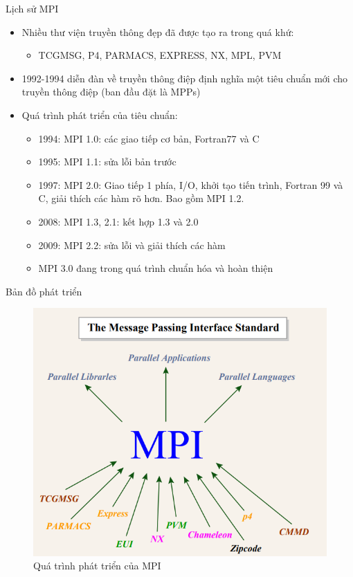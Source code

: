 \documentclass[10pt]{beamer}
\theoremstyle{remark}
\numberwithin{algocf}{section}
\numberwithin{equation}{section}
\numberwithin{dl}{section}
\numberwithin{figure}{section}
\begin{document}
\begin{frame}{Lịch sử MPI}
    \begin{itemize}
        \item Nhiều thư viện truyền thông đẹp đã được tạo ra trong quá khứ:
        \begin{itemize}
            \item TCGMSG, P4, PARMACS, EXPRESS, NX, MPL, PVM
        \end{itemize}
        \item 1992-1994 diễn đàn về truyền thông điệp định nghĩa một tiêu chuẩn mới cho truyền thông điệp (ban đầu đặt là MPPs)
        \item Quá trình phát triển của tiêu chuẩn:
        \begin{itemize}
            \item 1994: MPI 1.0: các giao tiếp cơ bản, Fortran77 và C
            \item 1995: MPI 1.1: sửa lỗi bản trước
            \item 1997: MPI 2.0: Giao tiếp 1 phía, I/O, khởi tạo tiến trình, Fortran 99 và C, giải thích các hàm rõ hơn. Bao gồm MPI 1.2.
            \item 2008: MPI 1.3, 2.1: kết hợp 1.3 và 2.0
            \item 2009: MPI 2.2: sửa lỗi và giải thích các hàm
            \item MPI 3.0 đang trong quá trình chuẩn hóa và hoàn thiện
        \end{itemize}
    \end{itemize}
\end{frame}

\begin{frame}{Bản đồ phát triển}
    \begin{figure}[H]
        \centering
        \includegraphics[width=0.75\linewidth]{figures/MPI/MPI_Genealogy.png}
        \caption{Quá trình phát triển của MPI}
    \end{figure}
\end{frame}
\end{document}
